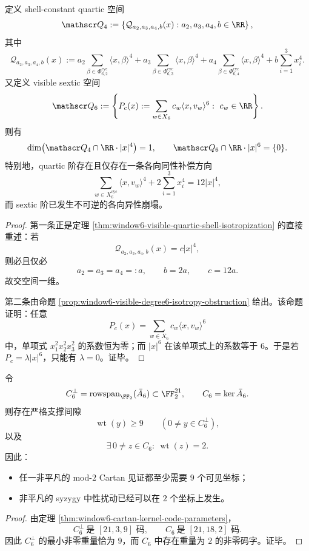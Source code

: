 \begin{theorem}\label{thm:conclusion-window6-quartic-sextic-isotropy-bifurcation}
定义 shell-constant quartic 空间
\[
\mathscr Q_4:=
\left\{
\mathcal Q_{a_2,a_3,a_4,b}(x):
a_2,a_3,a_4,b\in\RR
\right\},
\]
其中
\[
\mathcal Q_{a_2,a_3,a_4,b}(x)
:=
a_2\sum_{\beta\in \Phi_{6,2}^{\mathrm{cyc}}}\langle x,\beta\rangle^4
+a_3\sum_{\beta\in \Phi_{6,3}^{\mathrm{cyc}}}\langle x,\beta\rangle^4
+a_4\sum_{\beta\in \Phi_{6,4}^{\mathrm{cyc}}}\langle x,\beta\rangle^4
+b\sum_{i=1}^{3}x_i^4.
\]
又定义 visible sextic 空间
\[
\mathscr Q_6:=
\left\{
P_c(x):=\sum_{w\in X_6}c_w\langle x,v_w\rangle^6:\ c_w\in\RR
\right\}.
\]
则有
\[
\dim\bigl(\mathscr Q_4\cap \RR\cdot |x|^4\bigr)=1,
\qquad
\mathscr Q_6\cap \RR\cdot |x|^6=\{0\}.
\]
特别地，quartic 阶存在且仅存在一条各向同性补偿方向
\[
\sum_{w\in X_6^{\mathrm{cyc}}}\langle x,v_w\rangle^4
+2\sum_{i=1}^3x_i^4
=
12|x|^4,
\]
而 sextic 阶已发生不可逆的各向异性崩塌。
\end{theorem}
\begin{proof}
第一条正是定理 \ref{thm:window6-visible-quartic-shell-isotropization} 的直接重述：若
\[
\mathcal Q_{a_2,a_3,a_4,b}(x)=c|x|^4,
\]
则必且仅必
\[
a_2=a_3=a_4=:a,
\qquad
b=2a,
\qquad
c=12a.
\]
故交空间一维。

第二条由命题 \ref{prop:window6-visible-degree6-isotropy-obstruction} 给出。该命题证明：任意
\[
P_c(x)=\sum_{w\in X_6}c_w\langle x,v_w\rangle^6
\]
中，单项式 \(x_1^2x_2^2x_3^2\) 的系数恒为零；而 \(|x|^6\) 在该单项式上的系数等于 \(6\)。于是若 \(P_c=\lambda |x|^6\)，只能有 \(\lambda=0\)。证毕。
\end{proof}

\begin{theorem}\label{thm:conclusion-window6-cartan-syzygy-nine-two-support-gap}
令
\[
C_6^\perp=\operatorname{rowspan}_{\FF_2}(\bar A_6)\subset \FF_2^{21},
\qquad
C_6=\ker \bar A_6.
\]
则存在严格支撑间隙
\[
\operatorname{wt}(y)\ge 9
\qquad (0\neq y\in C_6^\perp),
\]
以及
\[
\exists\,0\neq z\in C_6:\ \operatorname{wt}(z)=2.
\]
因此：
\begin{itemize}
  \item 任一非平凡的 mod-\(2\) Cartan 见证都至少需要 \(9\) 个可见坐标；
  \item 非平凡的 syzygy 中性扰动已经可以在 \(2\) 个坐标上发生。
\end{itemize}
\end{theorem}
\begin{proof}
由定理 \ref{thm:window6-cartan-kernel-code-parameters}，
\[
C_6^\perp\ \text{是 }[21,3,9]\text{ 码},
\qquad
C_6\ \text{是 }[21,18,2]\text{ 码}.
\]
因此 \(C_6^\perp\) 的最小非零重量恰为 \(9\)，而 \(C_6\) 中存在重量为 \(2\) 的非零码字。证毕。
\end{proof}

